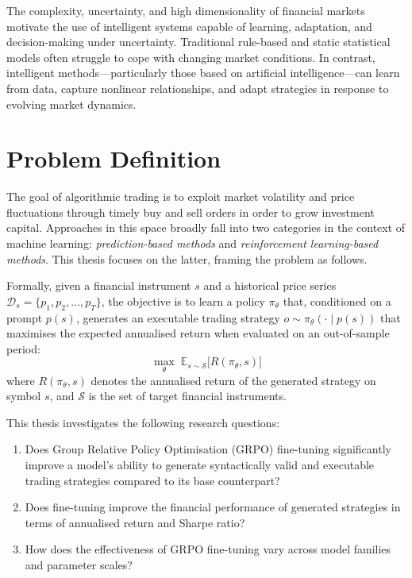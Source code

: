 \documentclass[12pt, a4paper]{report}
\begin{document}
The complexity, uncertainty, and high dimensionality of financial markets motivate the use of
intelligent systems capable of learning, adaptation, and decision-making under uncertainty.
Traditional rule-based and static statistical models often struggle to cope with changing market
conditions. In contrast, intelligent methods---particularly those based on artificial
intelligence---can learn from data, capture nonlinear relationships, and adapt strategies in
response to evolving market dynamics.

\section{Problem Definition}
\label{sec:problem}

The goal of algorithmic trading is to exploit market volatility and price  fluctuations through timely buy and sell 
orders in order to grow investment capital. Approaches in this space broadly fall into two categories in the 
context of machine learning: \emph{prediction-based methods} and \emph{reinforcement learning-based methods}. 
This thesis focuses on the latter, framing the problem as follows.

Formally, given a financial instrument $s$ and a historical price series $\mathcal{D}_s = \{p_1, p_2, \ldots, p_T\}$, 
the objective is to learn a policy $\pi_\theta$ that, conditioned on a prompt $p(s)$, generates an 
executable trading strategy $o \sim \pi_\theta(\cdot \mid p(s))$ that maximises the expected annualised 
return when evaluated on an out-of-sample period:
\begin{equation}
    \max_\theta \; \mathbb{E}_{s \sim \mathcal{S}}\bigl[R(\pi_\theta, s)\bigr]
\end{equation}
where $R(\pi_\theta, s)$ denotes the annualised return of the generated strategy on symbol $s$, 
and $\mathcal{S}$ is the set of target financial instruments.

This thesis investigates the following research questions:
\begin{enumerate}
    \item[\textbf{RQ1}] Does Group Relative Policy Optimisation (GRPO) fine-tuning significantly improve a model's
    ability to generate syntactically valid and executable trading strategies 
    compared to its base counterpart?
    \item[\textbf{RQ2}] Does fine-tuning improve the financial performance 
    of generated strategies in terms of annualised return and Sharpe ratio?
    \item[\textbf{RQ3}] How does the effectiveness of GRPO fine-tuning 
    vary across model families and parameter scales?
\end{enumerate}
\end{document}
